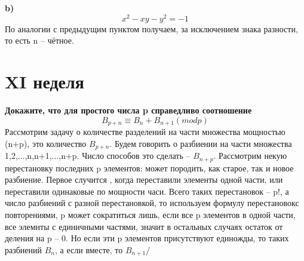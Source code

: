 \documentclass[a4paper,11pt]{article}
\begin{document}
\textbf{b)} \[x^2 - xy - y^2 = -1 \]
  По аналогии с предыдущим пунктом получаем, за исключением знака разности, то есть n -- чётное.

 
  
 \section*{XI неделя}
 \textbf{Докажите, что для простого числа p справедливо соотношение \[ B_{p+n}\equiv B_n+B_{n+1} (modp) \]}
 Рассмотрим задачу о количестве разделений на части множества мощностью (n+p), это количество $B_{p+n}$. 
 Будем говорить о разбиении на части множества {1,2,...,n,n+1,...,n+p}. Число способов это сделать -- $B_{n+p}$. Рассмотрим некую перестановку последних p элементов: может породить, как старое, так и новое разбиение. Первое случится , когда переставили  элементы одной части, или переставили одинаковые по мощности часи. Всего таких перестановок -- p!, а число разбиений с разной перестановкой, то используем формулу перестановокс повторениями, p может сократиться лишь, если все p элементов в одной части, все элемнты с единичными частями, значит в остальных случаях остаток от деления на p -- 0. Но если эти p элементов присутствуют единожды, то таких разбиений $B_{n}$, а если вместе, то $B_{n+1}$/
\end{document}
